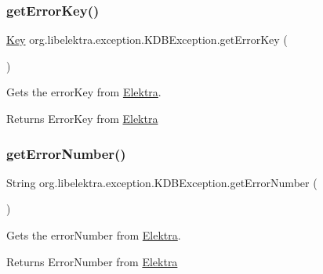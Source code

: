 \subsubsection{\texorpdfstring{getErrorKey()}{getErrorKey()}}
{\footnotesize\ttfamily \mbox{\hyperlink{classorg_1_1libelektra_1_1Key}{Key}} org.\+libelektra.\+exception.\+K\+D\+B\+Exception.\+get\+Error\+Key (\begin{DoxyParamCaption}{ }\end{DoxyParamCaption})\hspace{0.3cm}{\ttfamily [inline]}}



Gets the error\+Key from \mbox{\hyperlink{interfaceorg_1_1libelektra_1_1Elektra}{Elektra}}. 

\begin{DoxyReturn}{Returns}
Error\+Key from \mbox{\hyperlink{interfaceorg_1_1libelektra_1_1Elektra}{Elektra}} 
\end{DoxyReturn}
\mbox{\label{classorg_1_1libelektra_1_1exception_1_1KDBException_a3d07f27121a4870471ea6927d93c04a9}} 
\subsubsection{\texorpdfstring{getErrorNumber()}{getErrorNumber()}}
{\footnotesize\ttfamily String org.\+libelektra.\+exception.\+K\+D\+B\+Exception.\+get\+Error\+Number (\begin{DoxyParamCaption}{ }\end{DoxyParamCaption})\hspace{0.3cm}{\ttfamily [inline]}}



Gets the error\+Number from \mbox{\hyperlink{interfaceorg_1_1libelektra_1_1Elektra}{Elektra}}. 

\begin{DoxyReturn}{Returns}
Error\+Number from \mbox{\hyperlink{interfaceorg_1_1libelektra_1_1Elektra}{Elektra}} 
\end{DoxyReturn}
\mbox{\label{classorg_1_1libelektra_1_1exception_1_1KDBException_a80c8598787cff127a83290c87450dde0}} 

